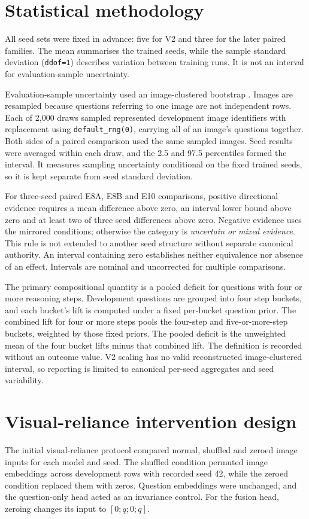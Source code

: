 \section{Statistical methodology}
\label{sec:ch3-statistics}
All seed sets were fixed in advance: five for V2 and three for the later
paired families. The mean summarises the trained seeds, while the sample
standard deviation (\texttt{ddof=1}) describes variation between training
runs. It is not an interval for evaluation-sample uncertainty.

Evaluation-sample uncertainty used an image-clustered bootstrap \citep{efron1993bootstrap,field2007clusterbootstrap}.
Images are resampled because questions referring to one image are not
independent rows. Each of 2,000 draws sampled represented development image
identifiers with replacement using \texttt{default\_rng(0)}, carrying all
of an image's questions together. Both sides of a paired comparison used the
same sampled images. Seed results were averaged within each draw, and the 2.5
and 97.5 percentiles formed the interval. It measures sampling uncertainty
conditional on the fixed trained seeds, so it is kept separate from seed
standard deviation.

For three-seed paired E8A, E8B and E10 comparisons, positive directional
evidence requires a mean difference above zero, an interval lower bound above
zero and at least two of three seed differences above zero. Negative evidence
uses the mirrored conditions; otherwise the category is \emph{uncertain or
mixed evidence}. This rule is not extended to another seed structure without
separate canonical authority. An interval containing zero establishes neither
equivalence nor absence of an effect. Intervals are nominal and uncorrected
for multiple comparisons.

The primary compositional quantity is a pooled deficit for questions with four
or more reasoning steps. Development questions are grouped into four step
buckets, and each bucket's lift is computed under a fixed per-bucket question
prior. The combined lift for four or more steps pools the four-step and
five-or-more-step buckets, weighted by those fixed priors. The pooled deficit
is the unweighted mean of the four bucket lifts minus that combined lift.
The definition is recorded without an outcome value. V2 scaling has no valid
reconstructed image-clustered interval, so reporting is limited to canonical
per-seed aggregates and seed variability.

\section{Visual-reliance intervention design}
\label{sec:ch3-reliance}
The initial visual-reliance protocol compared normal, shuffled and zeroed image
inputs for each model and seed. The shuffled condition permuted image
embeddings across development rows with recorded seed 42, while the zeroed
condition replaced them with zeros. Question embeddings were unchanged, and
the question-only head acted as an invariance control. For the fusion head,
zeroing changes its input to $[0;q;0;q]$.

